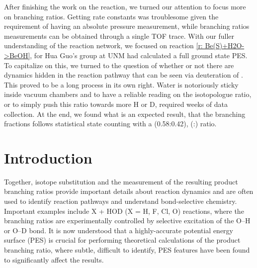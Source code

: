 After finishing the work on the  reaction, we turned our attention to focus more on branching ratios. Getting rate constants was troublesome given the requirement of having an absolute pressure measurement, while branching ratios measurements can be obtained through a single TOF trace. With our fuller understanding of the  reaction network, we focused on reaction \ref{r: Be(S)+H2O->BeOH}, for Hua Guo's group at UNM had calculated a full ground state PES. To capitalize on this, we turned to the question of whether or not there are dynamics hidden in the reaction pathway that can be seen via deuteration of . This proved to be a long process in its own right. Water is notoriously sticky inside vacuum chambers and to have a reliable reading on the isotopologue ratio, or to simply push this ratio towards more H or D, required weeks of data collection. At the end, we found what is an expected result, that the branching fractions follows statistical state counting with a (0.58:0.42), (:) ratio.

\section{Introduction}

Together, isotope substitution and the measurement of the resulting product branching ratios provide important details about reaction dynamics and are often used to identify reaction pathways and understand bond-selective chemistry.\cite{Crim1990,Crim1996,Zare1998} Important examples include X + HOD (X = H, F, Cl, O) reactions, where the branching ratios are experimentally controlled by selective excitation of the O–H or O–D bond.\cite{Sinha1990,Bronikowski1991,Metz1993a,Zhang1997,Song2015,Song2015a,Fu2015,Zheng2018a,Skouteris1999b} It is now understood that a highly-accurate potential energy surface (PES) is crucial for performing theoretical calculations of the product branching ratio, where subtle, difficult to identify, PES features have been found to significantly affect the results.\cite{Skouteris1999b}

